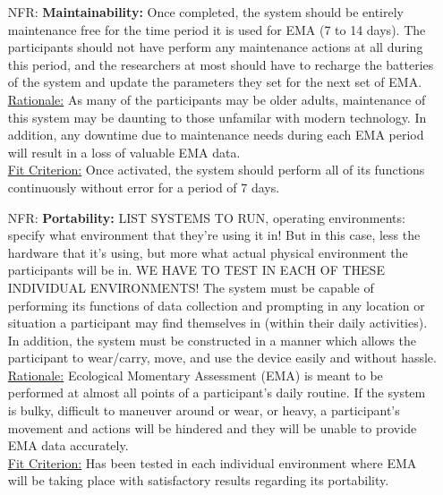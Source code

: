 \documentclass[12pt]{article}
\newcounter{nfrnum} %
\begin{document}
\begin{itemize}
\item[NFR\refstepcounter{nfrnum}\thenfrnum \label{NFR_Maintainability}:]
  \textbf{Maintainability:} Once completed, the system should be entirely maintenance free for the time period it is used for EMA (7 to 14 days). The participants should not have perform any maintenance actions at all during this period, and the researchers at most should have to recharge the batteries of the system and update the parameters they set for the next set of EMA.\\

\underline{Rationale:} As many of the participants may be older adults, maintenance of this system may be daunting to those unfamilar with modern technology. In addition, any downtime due to maintenance needs during each EMA period will result in a loss of valuable EMA data.\\

\underline{Fit Criterion:} Once activated, the system should perform all of its functions continuously without error for a period of 7 days.\\

\item[NFR\refstepcounter{nfrnum}\thenfrnum \label{NFR_Portability}:]
  \textbf{Portability:} LIST SYSTEMS TO RUN, operating environments: specify what environment that they're using it in! But in this case, less the hardware that it's using, but more what actual physical environment the participants will be in. WE HAVE TO TEST IN EACH OF THESE INDIVIDUAL ENVIRONMENTS! The system must be capable of performing its functions of data collection and prompting in any location or situation a participant may find themselves in (within their daily activities). In addition, the system must be constructed in a manner which allows the participant to wear/carry, move, and use the device easily and without hassle.\\

\underline{Rationale:} Ecological Momentary Assessment (EMA) is meant to be performed at almost all points of a participant's daily routine. If the system is bulky, difficult to maneuver around or wear, or heavy, a participant's movement and actions will be hindered and they will be unable to provide EMA data accurately.\\


\underline{Fit Criterion:} Has been tested in each individual environment where EMA will be taking place with satisfactory results regarding its portability.\\



\end{itemize}
\end{document}
